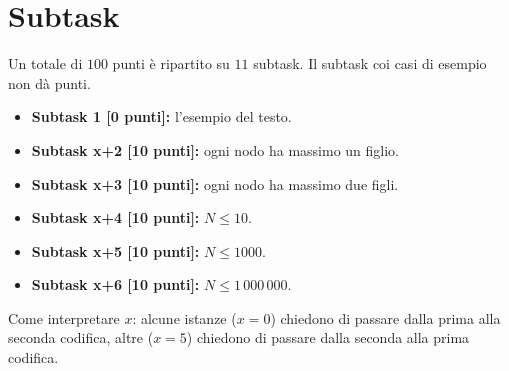 \documentclass[a4paper,11pt]{article}
\begin{document}
\section*{Subtask}
Un totale di $100$ punti \`e ripartito su $11$ subtask.
Il subtask coi casi di esempio non dà punti.
\begin{itemize}
\item \textbf{Subtask 1 [0 punti]:} l'esempio del testo.
\item \textbf{Subtask x+2 [10 punti]:} ogni nodo ha massimo un figlio.
\item \textbf{Subtask x+3 [10 punti]:} ogni nodo ha massimo due figli.
\item \textbf{Subtask x+4 [10 punti]:} $N \le 10$.
\item \textbf{Subtask x+5 [10 punti]:} $N \le 1000$.
\item \textbf{Subtask x+6 [10 punti]:} $N \le 1\,000\,000$.
\end{itemize}
Come interpretare $x$: alcune istanze ($x=0$) chiedono di passare dalla prima alla seconda codifica,
altre ($x=5$) chiedono di passare dalla seconda alla prima codifica.
\end{document}
